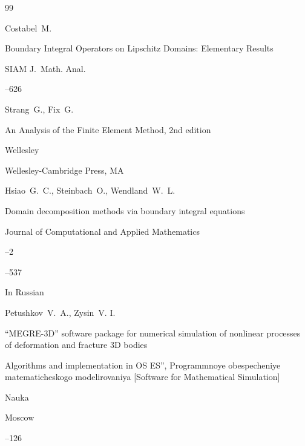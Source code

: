 \begin{thebibliography}{99}

\by Costabel~M.

\paper  Boundary Integral Operators on Lipschitz Domains: Elementary Results 

\jour SIAM J.~Math. Anal.




--626





\by Strang~G., Fix~G.

\paper An Analysis of the Finite Element Method, 2nd edition

\publaddr Wellesley

\publ Wellesley-Cambridge Press, MA






\by Hsiao~G.~C., Steinbach~O.,  Wendland~W.~L.

\paper Domain decomposition methods via boundary integral equations

\jour Journal of Computational and Applied Mathematics



--2

--537





\lang In Russian

\by  Petushkov~V.~A., Zysin~V. I.

\paper ``MEGRE-3D'' software package for numerical simulation of nonlinear processes of deformation and fracture 3D bodies

\inbook Algorithms and implementation in OS ES'', Programmnoye obespecheniye matematicheskogo modelirovaniya \rm [Software for Mathematical Simulation]

\publ Nauka

\publaddr Moscow


--126




\end{thebibliography}
